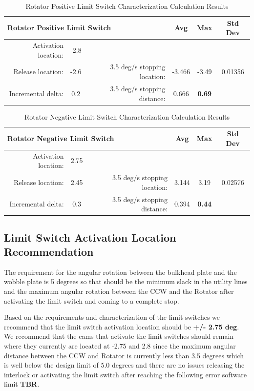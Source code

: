 \documentclass[SE,authoryear,toc, lsstdraft]{lsstdoc}
\begin{document}
\begin{table}[h!]
  \begin{center}
    \caption{Rotator Positive Limit Switch Characterization Calculation Results}
    \label{tab:table3}
    \begin{tabular}{r|c|r|c|c|c}
    \multicolumn{3}{l|}{\textbf{Rotator Positive Limit Switch}} & Avg & Max & Std Dev\\
    \midrule
    Activation location: & -2.8 & & & & \\
    Release location: & -2.6 & 3.5 deg/s stopping location: & -3.466 & -3.49 & 0.01356 \\
    Incremental delta: & 0.2 & 3.5 deg/s stopping distance: & 0.666 & \textbf{0.69} & \\
    \end{tabular}
  \end{center}
\end{table}

\begin{table}[h!]
  \begin{center}
    \caption{Rotator Negative Limit Switch Characterization Calculation Results}
    \label{tab:table4}
    \begin{tabular}{r|c|r|c|c|c}
    \multicolumn{3}{l|}{\textbf{Rotator Negative Limit Switch}} & Avg & Max & Std Dev\\
    \midrule
    Activation location: & 2.75 & & & & \\
    Release location: & 2.45 & 3.5 deg/s stopping location: & 3.144 & 3.19 & 0.02576 \\
    Incremental delta: & 0.3 & 3.5 deg/s stopping distance: & 0.394 & \textbf{0.44} & \\
    \end{tabular}
  \end{center}
\end{table}

\subsection{Limit Switch Activation Location Recommendation}

The  requirement for the angular rotation between the bulkhead plate and the wobble plate is
5 degrees so that should be the minimum slack in the utility lines and
the maximum angular rotation between the CCW and the Rotator after
activating the limit switch and coming to a complete stop.

Based on the requirements and characterization of the limit switches we
recommend that the limit switch activation location should be
\textbf{+/- 2.75 deg}. We recommend that the cams that activate the limit switches should remain where
they currently are located at -2.75 and 2.8 since the maximum angular distance between the CCW and
Rotator is currently less than 3.5 degrees which is well below the design limit of 5.0 degrees and
there are no issues releasing the interlock or activating the limit switch after reaching the
following error software limit \textbf{TBR}.
\end{document}
